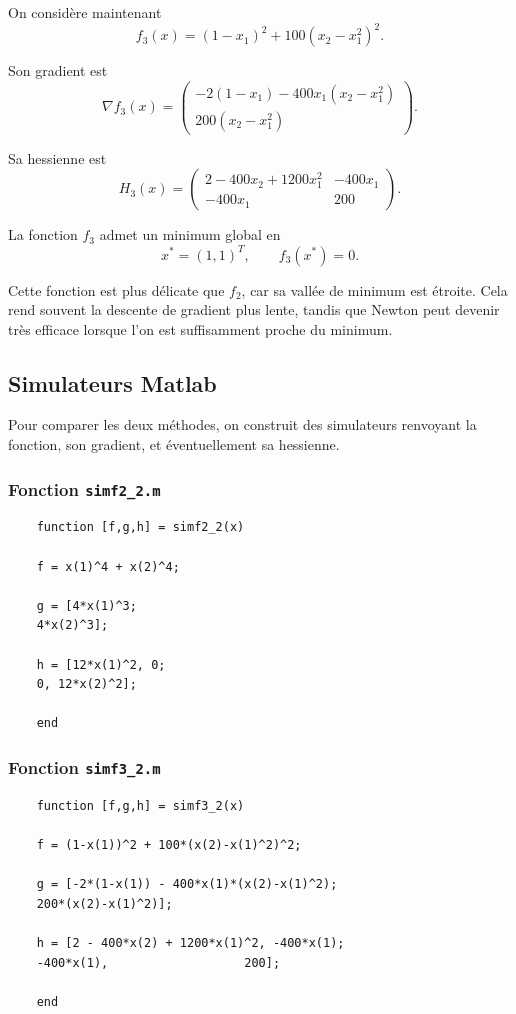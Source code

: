 \documentclass[a4paper,12pt]{article}
\begin{document}
	On considère maintenant
	\[
	f_3(x)=(1-x_1)^2+100(x_2-x_1^2)^2.
	\]
	
	Son gradient est
	\[
	\nabla f_3(x)=
	\begin{pmatrix}
	-2(1-x_1)-400x_1(x_2-x_1^2)\\
	200(x_2-x_1^2)
	\end{pmatrix}.
	\]
	
	Sa hessienne est
	\[
	H_3(x)=
	\begin{pmatrix}
	2-400x_2+1200x_1^2 & -400x_1\\
	-400x_1 & 200
	\end{pmatrix}.
	\]
	
	La fonction \(f_3\) admet un minimum global en
	\[
	x^*=(1,1)^T,
	\qquad
	f_3(x^*)=0.
	\]
	
	Cette fonction est plus délicate que \(f_2\), car sa vallée de minimum est étroite. Cela rend souvent la descente de gradient plus lente, tandis que Newton peut devenir très efficace lorsque l’on est suffisamment proche du minimum.
	
	\subsection{Simulateurs Matlab}
	
	Pour comparer les deux méthodes, on construit des simulateurs renvoyant la fonction, son gradient, et éventuellement sa hessienne.
	
	\subsubsection{Fonction \texttt{simf2\_2.m}}
	
	\begin{verbatim}
	function [f,g,h] = simf2_2(x)
	
	f = x(1)^4 + x(2)^4;
	
	g = [4*x(1)^3;
	4*x(2)^3];
	
	h = [12*x(1)^2, 0;
	0, 12*x(2)^2];
	
	end
	\end{verbatim}
	
	\subsubsection{Fonction \texttt{simf3\_2.m}}
	
	\begin{verbatim}
	function [f,g,h] = simf3_2(x)
	
	f = (1-x(1))^2 + 100*(x(2)-x(1)^2)^2;
	
	g = [-2*(1-x(1)) - 400*x(1)*(x(2)-x(1)^2);
	200*(x(2)-x(1)^2)];
	
	h = [2 - 400*x(2) + 1200*x(1)^2, -400*x(1);
	-400*x(1),                   200];
	
	end
	\end{verbatim}
	
\end{document}
